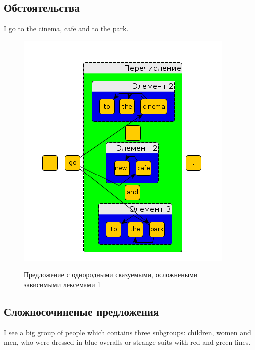 \documentclass{standalone}
\begin{document}
\subsection{Обстоятельства} %
%
I go to the cinema, cafe and to the park.
\begin{figure}[!ht]
\includegraphics[width=\textwidth]{images/sentences3.png}
\label{obstoyatelstvo}
\caption{Предложение с однородными сказуемыми, осложнеными зависимыми лексемами 1}
\end{figure}
\newpage
\subsection{Сложносочиненые предложения} %
%
I see a big group of people which contains three subgroups: children, women and men, who were dressed in blue overalls or strange suits with red and green lines.
\end{document}
